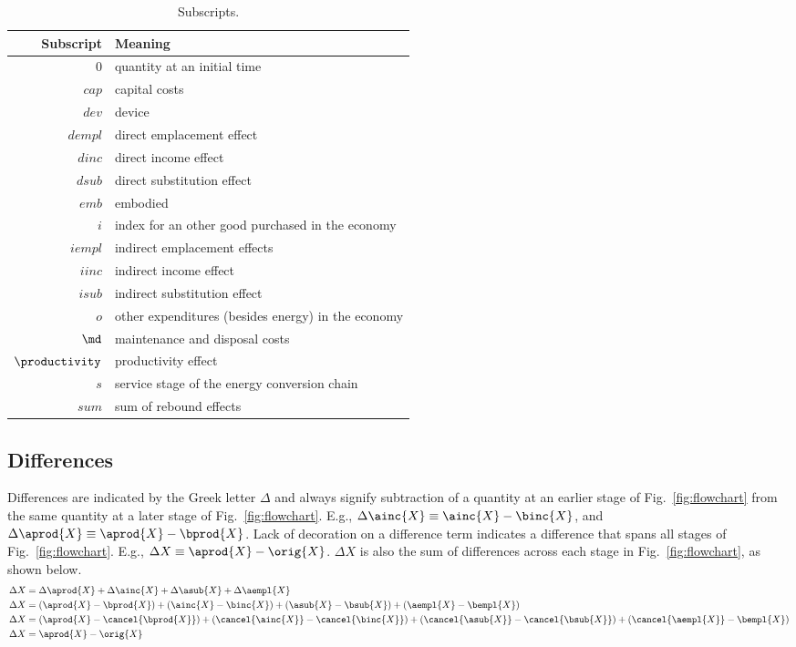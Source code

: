 \begin{table}
\centering
\caption{Subscripts.}
\begin{tabular}{r l}
  \toprule
  Subscript & Meaning \\
  \midrule
  $0$ & quantity at an initial time \\
  $cap$ & capital costs \\
  $dev$ & device \\
  $dempl$ & direct emplacement effect \\
  $dinc$ & direct income effect \\
  $dsub$ & direct substitution effect \\
  $emb$ & embodied \\
  $i$ & index for an other good purchased in the economy \\
  $iempl$ & indirect emplacement effects \\
  $iinc$ & indirect income effect \\
  $isub$ & indirect substitution effect \\
  $o$ & other expenditures (besides energy) in the economy \\
  $\md$ & maintenance and disposal costs \\
  $\productivity$ & productivity effect \\
  $s$ & service stage of the energy conversion chain \\
  $sum$ & sum of rebound effects \\
  \bottomrule
\end{tabular}
\label{tab:subscripts}
\end{table}


\subsection{Differences}
\label{sec:differences}

Differences are indicated by the Greek letter $\Delta$ and always
signify subtraction of a quantity at an earlier stage of Fig.~\ref{fig:flowchart}
from the same quantity at a later stage of Fig.~\ref{fig:flowchart}.
E.g.,
$\Delta \ainc{X} \equiv \ainc{X} - \binc{X}$, and
$\Delta \aprod{X} \equiv \aprod{X} - \bprod{X}$.
Lack of decoration on a difference term indicates a difference that spans all stages of Fig.~\ref{fig:flowchart}.
E.g., $\Delta X \equiv \aprod{X} - \orig{X}$.
$\Delta X$ is also the sum of differences across each stage in Fig.~\ref{fig:flowchart},
as shown below.
%
\begin{align}
\Delta X &= \Delta \aprod{X} + \Delta \ainc{X} + \Delta \asub{X} + \Delta \aempl{X} \nonumber \\
\Delta X &= (\aprod{X} - \bprod{X}) + (\ainc{X} - \binc{X})
            + (\asub{X} - \bsub{X}) + (\aempl{X} - \bempl{X}) \nonumber \\
\Delta X &= (\aprod{X} - \cancel{\bprod{X}}) + (\cancel{\ainc{X}} - \cancel{\binc{X}})
            + (\cancel{\asub{X}} - \cancel{\bsub{X}}) + (\cancel{\aempl{X}} - \bempl{X}) \nonumber \\
\Delta X &= \aprod{X} - \orig{X}
\end{align}
